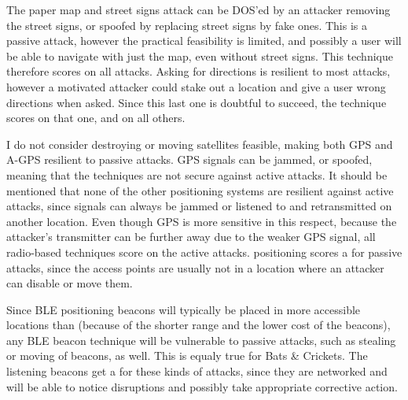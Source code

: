 The paper map and street signs attack can be DOS'ed by an attacker removing the street signs, or spoofed by replacing street signs by fake ones.
This is a passive attack, however the practical feasibility is limited, and possibly a user will be able to navigate with just the map, even without street signs.
This technique therefore scores \maybe on all attacks.
Asking for directions is resilient to most attacks, however a motivated attacker could stake out a location and give a user wrong directions when asked.
Since this last one is doubtful to succeed, the technique scores \maybe on that one, and \yes on all others.

I do not consider destroying or moving satellites feasible, making both GPS and A-GPS resilient to passive attacks.
GPS signals can be jammed\citep{grant2009gps}, or spoofed\citep{tippenhauer2011requirements}, meaning that the techniques are not secure against active attacks.
It should be mentioned that none of the other positioning systems are resilient against active attacks, since signals can always be jammed or listened to and retransmitted on another location.
Even though GPS is more sensitive in this respect, because the attacker's transmitter can be further away due to the weaker GPS signal, all radio-based techniques score \no on the active attacks.
\Wifi positioning scores a \maybe for passive attacks, since the \wifi access points are usually not in a location where an attacker can disable or move them.

Since BLE positioning beacons will typically be placed in more accessible locations than \wifi (because of the shorter range and the lower cost of the beacons), any BLE beacon technique will be vulnerable to passive attacks, such as stealing or moving of beacons, as well.
This is equaly true for Bats \& Crickets.
The listening beacons get a \maybe for these kinds of attacks, since they are networked and will be able to notice disruptions and possibly take appropriate corrective action.

